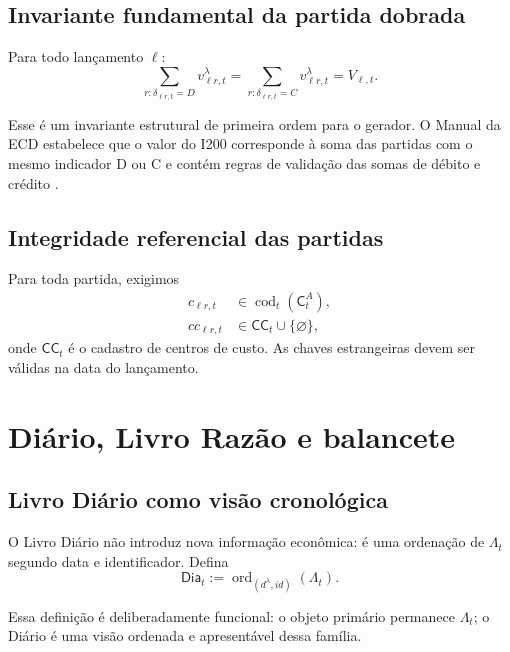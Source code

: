 \documentclass[11pt,a4paper]{article}
\newcommand{\Dia}{\mathsf{Dia}}
\newcommand{\cod}{\operatorname{cod}}
\newcommand{\ordena}{\operatorname{ord}}
\begin{document}
\subsection{Invariante fundamental da partida dobrada}

Para todo lançamento $\ell$:
\begin{equation}
\boxed{
\sum_{r:\delta_{\ell r,t}=D}v^\lambda_{\ell r,t}
=
\sum_{r:\delta_{\ell r,t}=C}v^\lambda_{\ell r,t}
=
V_{\ell,t}.
}
\label{eq:double-entry}
\end{equation}

Esse é um invariante estrutural de primeira ordem para o gerador. O Manual da ECD estabelece que o valor do I200 corresponde à soma das partidas com o mesmo indicador D ou C e contém regras de validação das somas de débito e crédito \cite{ECD2026}.

\subsection{Integridade referencial das partidas}

Para toda partida, exigimos
\begin{align}
c_{\ell r,t}&\in \cod_t(\mathsf C_t^{A}),\\
cc_{\ell r,t}&\in\mathsf{CC}_t\cup\{\varnothing\},
\end{align}
onde $\mathsf{CC}_t$ é o cadastro de centros de custo. As chaves estrangeiras devem ser válidas na data do lançamento.

\section{Diário, Livro Razão e balancete}

\subsection{Livro Diário como visão cronológica}

O Livro Diário não introduz nova informação econômica: é uma ordenação de $\Lambda_t$ segundo data e identificador. Defina
\begin{equation}
\boxed{
\Dia_t:=\ordena_{(d^\lambda,id)}(\Lambda_t).
}
\label{eq:journal}
\end{equation}

Essa definição é deliberadamente funcional: o objeto primário permanece $\Lambda_t$; o Diário é uma visão ordenada e apresentável dessa família.
\end{document}
